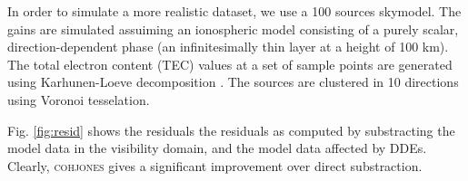 In order to simulate a more realistic dataset, we use a 100 sources
skymodel. The gains are simulated assuiming an ionospheric
model consisting
of a purely scalar, direction-dependent phase (an infinitesimally thin layer at a height of 100 km). The
total electron content (TEC) values at a set of sample points are
generated using Karhunen-Loeve decomposition \citep[the spatial correlation
is given by Kolmogorov turbulence, see][]{Tol09}. The sources are clustered in 10 directions using Voronoi
tesselation.

Fig. \ref{fig:resid} shows the residuals the residuals as
computed by substracting the model data in the visibility domain, and
the model data affected by DDEs. Clearly, \textsc{cohjones} gives a
significant improvement over direct substraction.





